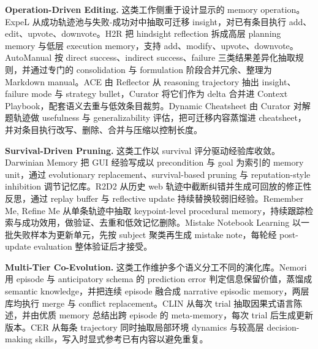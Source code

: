 \textbf{Operation-Driven Editing.} 这类工作侧重于设计显示的 memory operation。ExpeL \cite{Zha23c} 从成功轨迹池与失败-成功对中抽取可迁移 insight，对已有条目执行 add、edit、upvote、downvote。H2R \cite{Ye25b} 把 hindsight reflection 拆成高层 planning memory 与低层 execution memory，支持 add、modify、upvote、downvote。AutoManual \cite{Che24} 按 direct success、indirect success、failure 三类结果差异化抽取规则，并通过专门的 consolidation 与 formulation 阶段合并冗余、整理为 Markdown manual。ACE \cite{Zha25f} 由 Reflector 从 reasoning trajectory 抽出 insight、failure mode 与 strategy bullet，Curator 将它们作为 delta 合并进 Context Playbook，配套语义去重与低效条目裁剪。Dynamic Cheatsheet \cite{Suz25} 由 Curator 对解题轨迹做 usefulness 与 generalizability 评估，把可迁移内容蒸馏进 cheatsheet，并对条目执行改写、删除、合并与压缩以控制长度。


\textbf{Survival-Driven Pruning.} 这类工作以 survival 评分驱动经验库收敛。Darwinian Memory \cite{Mi26b} 把 GUI 经验写成以 precondition 与 goal 为索引的 memory unit，通过 evolutionary replacement、survival-based pruning 与 reputation-style inhibition 调节记忆库。R2D2 \cite{Hua25e} 从历史 web 轨迹中截断纠错并生成可回放的修正性反思，通过 replay buffer 与 reflective update 持续替换较弱旧经验。Remember Me, Refine Me \cite{Cao25} 从单条轨迹中抽取 keypoint-level procedural memory，持续跟踪检索与成功效用，做验证、去重和低效记忆删除。Mistake Notebook Learning \cite{Su25} 以一批失败样本为更新单元，先按 subject 聚类再生成 mistake note，每轮经 post-update evaluation 整体验证后才接受。

\textbf{Multi-Tier Co-Evolution.} 这类工作维护多个语义分工不同的演化库。Nemori \cite{Ma25} 用 episode 与 anticipatory schema 的 prediction error 判定信息保留价值，蒸馏成 semantic knowledge，并把连续 episode 融合成 narrative episodic memory，两层库均执行 merge 与 conflict replacement。CLIN \cite{Maj23} 从每次 trial 抽取因果式语言陈述，并由优质 memory 总结出跨 episode 的 meta-memory，每次 trial 后生成更新版本。CER \cite{Liu25} 从每条 trajectory 同时抽取局部环境 dynamics 与较高层 decision-making skills，写入时显式参考已有内容以避免重复。

